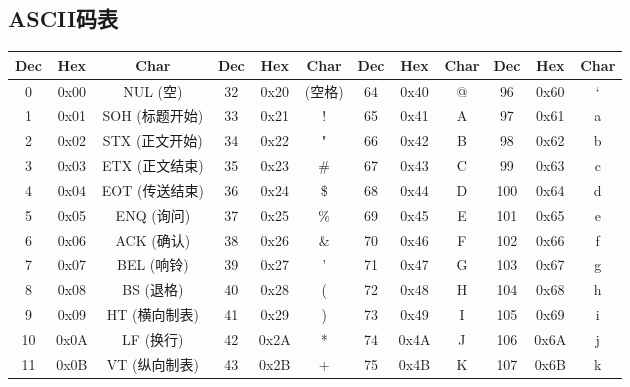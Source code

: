 \documentclass[a4paper, twoside]{article}
\begin{document}
    \subsection{ASCII码表}
    \begin{table}[h]
        \centering
        \renewcommand{\arraystretch}{1.4}
        \setlength{\tabcolsep}{5pt}
        \begin{tabular}{|c c c|c c c|c c c|c c c|}
            \hline
            \textbf{Dec} & \textbf{Hex} & \textbf{Char} & \textbf{Dec} & \textbf{Hex} & \textbf{Char} & \textbf{Dec} & \textbf{Hex} & \textbf{Char} & \textbf{Dec} & \textbf{Hex} & \textbf{Char} \\
            \hline
             0  & 0x00 & NUL (空)          & 32  & 0x20 & (空格)     & 64  & 0x40 & @           &  96  & 0x60 & `            \\
             1  & 0x01 & SOH (标题开始)    & 33  & 0x21 & !          & 65  & 0x41 & A           &  97  & 0x61 & a            \\
             2  & 0x02 & STX (正文开始)    & 34  & 0x22 & "          & 66  & 0x42 & B           &  98  & 0x62 & b            \\
             3  & 0x03 & ETX (正文结束)    & 35  & 0x23 & \#         & 67  & 0x43 & C           &  99  & 0x63 & c            \\
             4  & 0x04 & EOT (传送结束)    & 36  & 0x24 & \$         & 68  & 0x44 & D           & 100  & 0x64 & d            \\
             5  & 0x05 & ENQ (询问)        & 37  & 0x25 & \%         & 69  & 0x45 & E           & 101  & 0x65 & e            \\
             6  & 0x06 & ACK (确认)        & 38  & 0x26 & \&         & 70  & 0x46 & F           & 102  & 0x66 & f            \\
             7  & 0x07 & BEL (响铃)        & 39  & 0x27 & '          & 71  & 0x47 & G           & 103  & 0x67 & g            \\
             8  & 0x08 & BS (退格)         & 40  & 0x28 & (          & 72  & 0x48 & H           & 104  & 0x68 & h            \\
             9  & 0x09 & HT (横向制表)     & 41  & 0x29 & )          & 73  & 0x49 & I           & 105  & 0x69 & i            \\
            10  & 0x0A & LF (换行)         & 42  & 0x2A & *          & 74  & 0x4A & J           & 106  & 0x6A & j            \\
            11  & 0x0B & VT (纵向制表)     & 43  & 0x2B & +          & 75  & 0x4B & K           & 107  & 0x6B & k            \\

\end{tabular}
\end{table}
\end{document}

